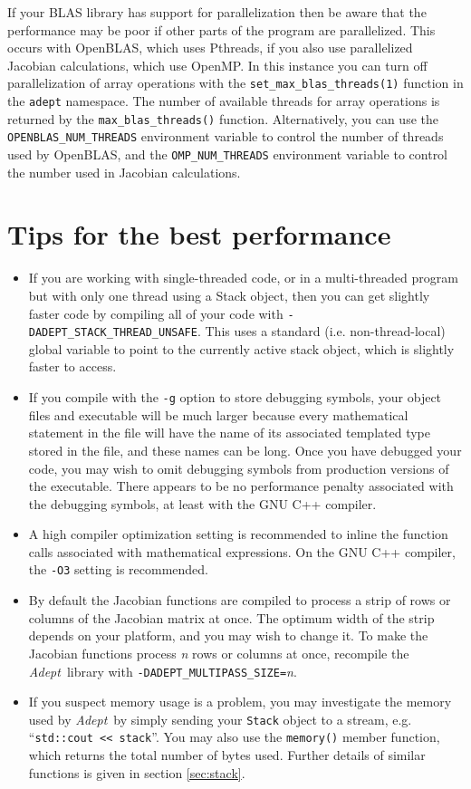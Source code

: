 \documentclass[a4,oneside]{book}
\def\codesize{\small}
\def\Adept{\emph{Adept}}
\def\code#1{{\codesize\texttt{#1}}}
\begin{document}
If your BLAS library has support for parallelization then be aware
that the performance may be poor if other parts of the program are
parallelized.  This occurs with OpenBLAS, which uses Pthreads, if you
also use parallelized Jacobian calculations, which use OpenMP.  In
this instance you can turn off parallelization of array operations
with the \code{set\_max\_blas\_threads(1)} function in the
\code{adept} namespace.  The number of available threads for array
operations is returned by the \code{max\_blas\_threads()} function.
Alternatively, you can use the \code{OPENBLAS\_NUM\_THREADS}
environment variable to control the number of threads used by
OpenBLAS, and the \code{OMP\_NUM\_THREADS} environment variable to
control the number used in Jacobian calculations.


\section{Tips for the best performance}
\label{sec:tips}
\begin{itemize}
\item If you are working with single-threaded code, or in a
  multi-threaded program but with only one thread using a Stack
  object, then you can get slightly faster code by compiling all of
  your code with \code{-DADEPT\_STACK\_THREAD\_UNSAFE}. This uses a
  standard (i.e. non-thread-local) global variable to point to the
  currently active stack object, which is slightly faster to access.
\item If you compile with the \code{-g} option to store debugging
  symbols, your object files and executable will be much larger
  because every mathematical statement in the file will have the name
  of its associated templated type stored in the file, and these names
  can be long. Once you have debugged your code, you may wish to omit
  debugging symbols from production versions of the executable.  There
  appears to be no performance penalty associated with the debugging
  symbols, at least with the GNU C++ compiler.
\item A high compiler optimization setting is recommended to inline
  the function calls associated with mathematical expressions.  On the
  GNU C++ compiler, the \code{-O3} setting is recommended.
\item By default the Jacobian functions are compiled to process a
  strip of rows or columns of the Jacobian matrix at once. The optimum
  width of the strip depends on your platform, and you may wish to
  change it. To make the Jacobian functions process \textit{n} rows or
  columns at once, recompile the \Adept\ library with
  \code{-DADEPT\_MULTIPASS\_SIZE=}\textit{n}.
\item If you suspect memory usage is a problem, you may investigate
  the memory used by \Adept\ by simply sending your \code{Stack} object to a
  stream, e.g. ``\code{std::cout \textless\textless\ stack}''. You may
  also use the \code{memory()} member function, which returns the
  total number of bytes used. Further details of similar functions is
  given in section \ref{sec:stack}.
\end{itemize}
\end{document}
